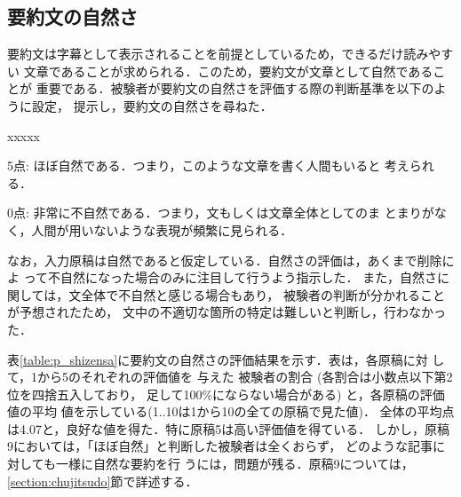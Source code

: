 \subsection{要約文の自然さ}
\label{section:shizensa}

要約文は字幕として表示されることを前提としているため，できるだけ読みやすい
文章であることが求められる．このため，要約文が文章として自然であることが
重要である．被験者が要約文の自然さを評価する際の判断基準を以下のように設定，
提示し，要約文の自然さを尋ねた．
\begin{itemize}
 \begin{namelist}{xxxxx}
  \item[5点:] ほぼ自然である．つまり，このような文章を書く人間もいると
	      考えられる．
  \item[0点:] 非常に不自然である．つまり，文もしくは文章全体としてのま
             とまりがなく，人間が用いないような表現が頻繁に見られる．
 \end{namelist}
\end{itemize}

なお，入力原稿は自然であると仮定している．自然さの評価は，あくまで削除によ
って不自然になった場合のみに注目して行うよう指示した．
また，自然さに関しては，文全体で不自然と感じる場合もあり，
被験者の判断が分かれることが予想されたため，
文中の不適切な箇所の特定は難しいと判断し，行わなかった．

表\ref{table:p_shizensa}に要約文の自然さの評価結果を示す．表は，各原稿に対
して，1から5のそれぞれの評価値を
与えた
被験者の割合
(各割合は小数点以下第2位を四捨五入しており，
足して100\%にならない場合がある)
と，各原稿の評価値の平均
値を示している(1..10は1から10の全ての原稿で見た値)．
全体の平均点は4.07と，良好な値を得た．特に原稿5は高い評価値を得ている．
しかし，原稿9においては，「ほぼ自然」と判断した被験者は全くおらず，
どのような記事に対しても一様に自然な要約を行
うには，問題が残る．原稿9については，\ref{section:chujitsudo}節で詳述する．

